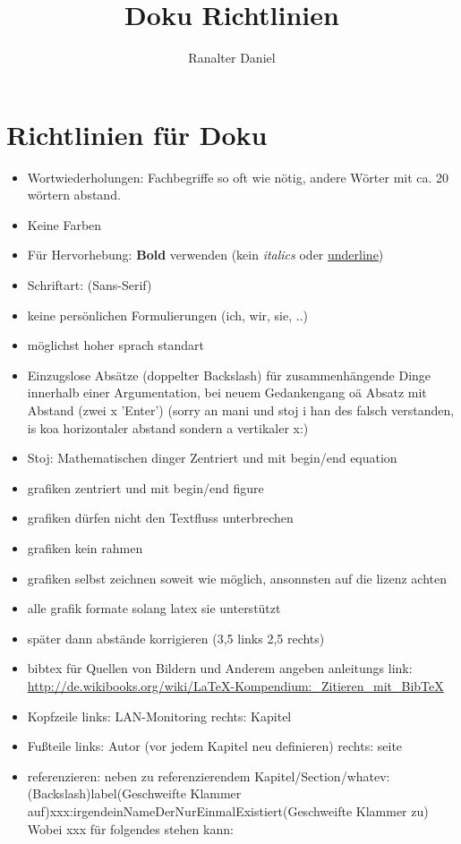 \documentclass[10pt,a4paper]{report}
\title{Doku Richtlinien}
\author{Ranalter Daniel}
\begin{document}
\chapter{Richtlinien für Doku}
\begin{itemize}
\item Wortwiederholungen: Fachbegriffe so oft wie nötig, andere Wörter mit ca. 20 wörtern abstand.
\item Keine Farben
\item Für Hervorhebung: \textbf{Bold} verwenden (kein \textit{italics} oder \underline{underline})
\item Schriftart: (Sans-Serif)
\item keine persönlichen Formulierungen (ich, wir, sie, ..)
\item möglichst hoher sprach standart 
\item Einzugslose Absätze (doppelter Backslash) für zusammenhängende Dinge innerhalb einer Argumentation, bei neuem Gedankengang oä Absatz mit Abstand (zwei x 'Enter') (sorry an mani und stoj i han des falsch verstanden, is koa horizontaler abstand sondern a vertikaler x:)
\item Stoj: Mathematischen dinger Zentriert und mit begin/end equation
\item grafiken zentriert und mit begin/end figure
\item grafiken dürfen nicht den Textfluss unterbrechen
\item grafiken kein rahmen
\item grafiken selbst zeichnen soweit wie möglich, ansonnsten auf die lizenz achten
\item alle grafik formate solang latex sie unterstützt
\item später dann abstände korrigieren (3,5 links 2,5 rechts)
\item bibtex für Quellen von Bildern und Anderem angeben anleitungs link: \url{http://de.wikibooks.org/wiki/LaTeX-Kompendium:_Zitieren_mit_BibTeX}
\item Kopfzeile links: LAN-Monitoring rechts: Kapitel
\item Fußteile links: Autor (vor jedem Kapitel neu definieren) rechts: seite
\item referenzieren: neben zu referenzierendem Kapitel/Section/whatev: (Backslash)label(Geschweifte Klammer auf)xxx:irgendeinNameDerNurEinmalExistiert(Geschweifte Klammer zu)\\
Wobei xxx für folgendes stehen kann:\\
\begin{center}

\end{center}
\end{itemize}
\end{document}
